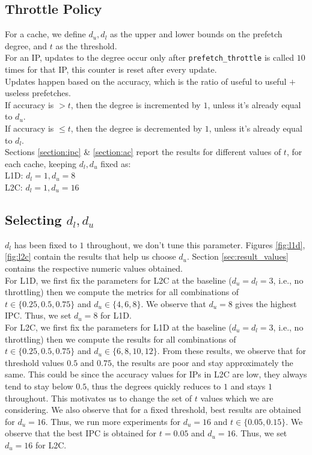 \documentclass[11pt, swedish, openany]{book}
\begin{document}
\subsection{Throttle Policy}
For a cache, we define $d_u, d_l$ as the upper and lower bounds on the prefetch degree, and $t$ as the threshold.\\
For an IP, updates to the degree occur only after \texttt{prefetch\_throttle} is called $10$ times for that IP, this counter is reset after every update.\\
Updates happen based on the accuracy, which is the ratio of useful to useful $+$ useless prefetches.\\
If accuracy is $> t$, then the degree is incremented by $1$, unless it's already equal to $d_u$.\\
If accuracy is $\le t$, then the degree is decremented by $1$, unless it's already equal to $d_l$.\\
Sections \ref{section:ipc} \& \ref{section:ac} report the results for different values of $t$, for each cache, keeping $d_l, d_u$ fixed as:\\
L1D: $d_l = 1, d_u = 8$\\
L2C: $d_l = 1, d_u = 16$

\subsection{Selecting $d_l, d_u$}
$d_l$ has been fixed to $1$ throughout, we don't tune this parameter. Figures \ref{fig:l1d}, \ref{fig:l2c} contain the results that help us choose $d_u$. Section \ref{sec:result_values} contains the respective numeric values obtained.\\
For L1D, we first fix the parameters for L2C at the baseline ($d_u = d_l = 3$, i.e., no throttling) then we compute the metrics for all combinations of $t \in \{0.25, 0.5, 0.75\}$ and $d_u \in \{4, 6, 8\}$. We observe that $d_u = 8$ gives the highest IPC. Thus, we set $d_u = 8$ for L1D.\\
For L2C, we first fix the parameters for L1D at the baseline ($d_u = d_l = 3$, i.e., no throttling) then we compute the results for all combinations of $t \in \{0.25, 0.5, 0.75\}$ and $d_u \in \{6, 8, 10, 12\}$. From these results, we observe that for threshold values $0.5$ and $0.75$, the results are poor and stay approximately the same. This could be since the accuracy values for IPs in L2C are low, they always tend to stay below $0.5$, thus the degrees quickly reduces to $1$ and stays $1$ throughout. This motivates us to change the set of $t$ values which we are considering. We also observe that for a fixed threshold, best results are obtained for $d_u = 16$. Thus, we run more experiments for $d_u = 16$ and $t \in \{0.05, 0.15\}$. We observe that the best IPC is obtained for $t = 0.05$ and $d_u = 16$. Thus, we set $d_u = 16$ for L2C.
\end{document}
